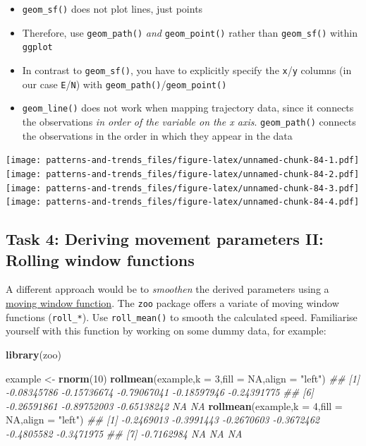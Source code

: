 \documentclass[]{book}
\newenvironment{Shaded}{\begin{snugshade}}{\end{snugshade}}
\newcommand{\CommentTok}[1]{\textcolor[rgb]{0.56,0.35,0.01}{\textit{#1}}}
\newcommand{\DataTypeTok}[1]{\textcolor[rgb]{0.13,0.29,0.53}{#1}}
\newcommand{\DecValTok}[1]{\textcolor[rgb]{0.00,0.00,0.81}{#1}}
\newcommand{\KeywordTok}[1]{\textcolor[rgb]{0.13,0.29,0.53}{\textbf{#1}}}
\newcommand{\NormalTok}[1]{#1}
\newcommand{\OtherTok}[1]{\textcolor[rgb]{0.56,0.35,0.01}{#1}}
\newcommand{\StringTok}[1]{\textcolor[rgb]{0.31,0.60,0.02}{#1}}
\providecommand{\tightlist}{%
  \setlength{\itemsep}{0pt}\setlength{\parskip}{0pt}}
\begin{document}
\begin{itemize}
\tightlist
\item
  \texttt{geom\_sf()} does not plot lines, just points
\item
  Therefore, use \texttt{geom\_path()} \emph{and} \texttt{geom\_point()} rather than \texttt{geom\_sf()} within \texttt{ggplot}
\item
  In contrast to \texttt{geom\_sf()}, you have to explicitly specify the \texttt{x}/\texttt{y} columns (in our case \texttt{E}/\texttt{N}) with \texttt{geom\_path()}/\texttt{geom\_point()}
\item
  \texttt{geom\_line()} does not work when mapping trajectory data, since it connects the observations \emph{in order of the variable on the x axis}. \texttt{geom\_path()} connects the observations in the order in which they appear in the data
\end{itemize}

\texttt{[image: patterns-and-trends\_files/figure-latex/unnamed-chunk-84-1.pdf]} \texttt{[image: patterns-and-trends\_files/figure-latex/unnamed-chunk-84-2.pdf]} \texttt{[image: patterns-and-trends\_files/figure-latex/unnamed-chunk-84-3.pdf]} \texttt{[image: patterns-and-trends\_files/figure-latex/unnamed-chunk-84-4.pdf]}

\hypertarget{task-4-deriving-movement-parameters-ii-rolling-window-functions}{%
\subsection{Task 4: Deriving movement parameters II: Rolling window functions}\label{task-4-deriving-movement-parameters-ii-rolling-window-functions}}

A different approach would be to \emph{smoothen} the derived parameters using a \href{https://docs.wavefront.com/images/5sec_moving_window.png}{moving window function}. The \texttt{zoo} package offers a variate of moving window functions (\texttt{roll\_*}). Use \texttt{roll\_mean()} to smooth the calculated speed. Familiarise yourself with this function by working on some dummy data, for example:

\begin{Shaded}
\begin{Highlighting}[]

\KeywordTok{library}\NormalTok{(zoo)}

\NormalTok{example <-}\StringTok{ }\KeywordTok{rnorm}\NormalTok{(}\DecValTok{10}\NormalTok{)}
\KeywordTok{rollmean}\NormalTok{(example,}\DataTypeTok{k =} \DecValTok{3}\NormalTok{,}\DataTypeTok{fill =} \OtherTok{NA}\NormalTok{,}\DataTypeTok{align =} \StringTok{"left"}\NormalTok{)}
\CommentTok{##  [1] -0.08345786 -0.15736674 -0.79067041 -0.18597946 -0.24391775}
\CommentTok{##  [6] -0.26591861 -0.89752003 -0.65138242          NA          NA}
\KeywordTok{rollmean}\NormalTok{(example,}\DataTypeTok{k =} \DecValTok{4}\NormalTok{,}\DataTypeTok{fill =} \OtherTok{NA}\NormalTok{,}\DataTypeTok{align =} \StringTok{"left"}\NormalTok{)}
\CommentTok{##  [1] -0.2469013 -0.3991443 -0.2670603 -0.3672462 -0.4805582 -0.3471975}
\CommentTok{##  [7] -0.7162984         NA         NA         NA}
\end{Highlighting}
\end{Shaded}
\end{document}
